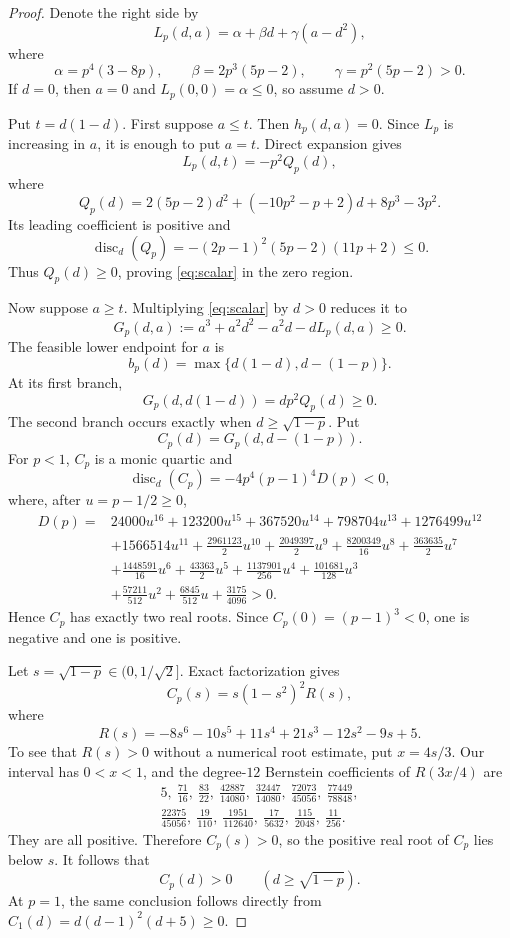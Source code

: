 \documentclass[11pt]{article}
\begin{document}
\begin{proof}
Denote the right side by
\[
 L_p(d,a)=\alpha+\beta d+\gamma(a-d^2),
\]
where
\[
 \alpha=p^4(3-8p),\qquad
 \beta=2p^3(5p-2),\qquad
 \gamma=p^2(5p-2)>0.
\]
If $d=0$, then $a=0$ and $L_p(0,0)=\alpha\leq0$, so assume $d>0$.

Put $t=d(1-d)$.  First suppose $a\leq t$.  Then $h_p(d,a)=0$.
Since $L_p$ is increasing in $a$, it is enough to put $a=t$.  Direct
expansion gives
\[
 L_p(d,t)=-p^2Q_p(d),
\]
where
\[
 Q_p(d)=2(5p-2)d^2+(-10p^2-p+2)d+8p^3-3p^2.
\]
Its leading coefficient is positive and
\[
 \operatorname{disc}_d(Q_p)
 =-(2p-1)^2(5p-2)(11p+2)\leq0.
\]
Thus $Q_p(d)\geq0$, proving \eqref{eq:scalar} in the zero region.

Now suppose $a\geq t$.  Multiplying \eqref{eq:scalar} by $d>0$ reduces it
to
\begin{equation}
 G_p(d,a):=a^3+a^2d^2-a^2d-dL_p(d,a)\geq0.
 \label{eq:G}
\end{equation}
The feasible lower endpoint for $a$ is
\[
 b_p(d)=\max\{d(1-d),d-(1-p)\}.
\]
At its first branch,
\begin{equation}
 G_p(d,d(1-d))=dp^2Q_p(d)\geq0.
 \label{eq:first-boundary}
\end{equation}
The second branch occurs exactly when $d\geq\sqrt{1-p}$.  Put
\[
 C_p(d)=G_p(d,d-(1-p)).
\]
For $p<1$, $C_p$ is a monic quartic and
\[
 \operatorname{disc}_d(C_p)
 =-4p^4(p-1)^4D(p)<0,
\]
where, after $u=p-1/2\geq0$,
\begin{align*}
 D(p)={}&24000u^{16}+123200u^{15}+367520u^{14}+798704u^{13}
 +1276499u^{12}\\
 &+1566514u^{11}+\frac{2961123}{2}u^{10}
 +\frac{2049397}{2}u^9+\frac{8200349}{16}u^8
 +\frac{363635}{2}u^7\\
 &+\frac{1448591}{16}u^6+\frac{43363}{2}u^5
 +\frac{1137901}{256}u^4+\frac{101681}{128}u^3\\
 &+\frac{57211}{512}u^2+\frac{6845}{512}u
 +\frac{3175}{4096}>0.
\end{align*}
Hence $C_p$ has exactly two real roots.  Since
$C_p(0)=(p-1)^3<0$, one is negative and one is positive.

Let $s=\sqrt{1-p}\in(0,1/\sqrt2]$.  Exact factorization gives
\[
 C_p(s)=s(1-s^2)^2R(s),
\]
where
\[
 R(s)=-8s^6-10s^5+11s^4+21s^3-12s^2-9s+5.
\]
To see that $R(s)>0$ without a numerical root estimate, put
$x=4s/3$.  Our interval has $0<x<1$, and the degree-$12$ Bernstein
coefficients of $R(3x/4)$ are
\[
\begin{gathered}
5,\ \frac{71}{16},\ \frac{83}{22},\ \frac{42887}{14080},\
\frac{32447}{14080},\ \frac{72073}{45056},\ \frac{77449}{78848},\\
\frac{22375}{45056},\ \frac{19}{110},\ \frac{1951}{112640},\
\frac{17}{5632},\ \frac{115}{2048},\ \frac{11}{256}.
\end{gathered}
\]
They are all positive.  Therefore $C_p(s)>0$, so the positive real root of
$C_p$ lies below $s$.  It follows that
\begin{equation}
 C_p(d)>0\qquad(d\geq\sqrt{1-p}).
 \label{eq:second-boundary}
\end{equation}
At $p=1$, the same conclusion follows directly from
$C_1(d)=d(d-1)^2(d+5)\geq0$.


\end{proof}
\end{document}
